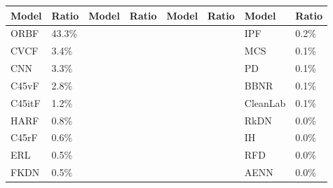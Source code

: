 \begin{tabular}{llllllll}
\toprule
 Model & Ratio & Model & Ratio & Model & Ratio &    Model & Ratio \\
\midrule
  ORBF & 43.3\% &       &       &       &       &      IPF &  0.2\% \\
  CVCF &  3.4\% &       &       &       &       &      MCS &  0.1\% \\
   CNN &  3.3\% &       &       &       &       &       PD &  0.1\% \\
 C45vF &  2.8\% &       &       &       &       &     BBNR &  0.1\% \\
C45itF &  1.2\% &       &       &       &       & CleanLab &  0.1\% \\
  HARF &  0.8\% &       &       &       &       &     RkDN &  0.0\% \\
 C45rF &  0.6\% &       &       &       &       &       IH &  0.0\% \\
   ERL &  0.5\% &       &       &       &       &      RFD &  0.0\% \\
  FKDN &  0.5\% &       &       &       &       &     AENN &  0.0\% \\
\bottomrule
\end{tabular}
